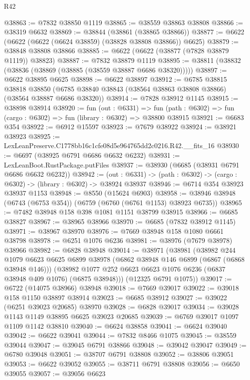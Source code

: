\begin{lexlean}{R42}
\begin{coremodule}
{@38863 := @7832 @38850 @1119
@38865 := @38559 @38863 @38808
@38866 := @38319 @6632
@38869 := @38844 (@38861 (@38865 @38866))
@38877 := @6622 (@6622 (@6622 (@6624 @38859) (@38828 @38808 @38866)) @6625)
@38879 := @38848 @38808 @38866
@38885 := @6622 (@6622 (@38877 (@7828 @38879 @1119)) @38823)
@38887 := @7832 @38879 @1119
@38895 := @38811 (@38832 (@38836 (@38869 (@38885 (@38559 @38887 @6686 @38320)))))
@38897 := @6622 @38895 @6625
@38898 := @6622 @38897
@38912 := @6785
    @38815
    @38818
    @38850
    (@6785 @38840 @38843 (@38564 @38863 @38808 @38866) (@38564 @38887 @6686 @38320))
@38914 := @7828 @38912 @1145
@38915 := @38898 @38914
@38920 := fun (out : @6331) =>
  fun (path : @6302) => fun (cargo : @6302) => fun (library : @6302) => @38800 @38915
@38921 := @6683 @354
@38922 := @6912 @15597
@38923 := @7679 @38922
@38924 := @38921 @38923
@38925 := LexLeanPreserve.C1778bb16c1cfe08d5e964765dd2c0216.R42.__fits_16
@38930 := @6697 (@38925 @6791 @6686 @6632 @6232)
@38931 := LexLeanBoot.RustPackage.putFiles
@38937 := @38930 (@6685 (@38931 @6791 @6686 @6632 @6232))
@38942 := (out : @6331) -> (path : @6302) -> (cargo : @6302) -> (library : @6302) -> @38924 @38937
@38946 := @6714 @354 @38923 @38937 @1153
@38948 := @8550 (@15624 @6903)
@38958 := @38946 @38948 (@6743 (@6753 @354)) (@6759 (@6760 (@6761 @1153) @38923 @6735))
@38965 := @7482 @38948 @158 @398 @1081 @1151 @38799 @38915
@38966 := @6685 @38827
@38967 := @38965 @38966
@38970 := @6685 (@7832 @38912 @1145)
@38971 := @38967 @38970
@38976 := @7669 @38948 @158 @1080 @6661 @38798
@38978 := @6251 @1076 @6236
@38981 := @38976 (@7679 @38978) @38966
@38982 := @6828 @38948
@39014 := @38971
    (@38981
      (@38982
        @244
        @1079
        @6623
        @6625
        @6899
        @38978
        (@6862 @38948 @146 @6899 (@6867 (@6868 @38948 @146)))
        (@38982 @1077 @252 @6623 @6623 @1076 @6236 (@6837 @38948 @409 @1076) (@6875 @38948)))
      (@12325 @6791 @1075))
@39017 := @6722 (@14075 @38966) @38948
@39018 := @7669 @39017
@39022 := @39018 @158 @1150 @38897 @38914
@39023 := @6685 @38912
@39027 := @39022 (@6251 @39023 @20685) @38970
@39028 := @6828 @39017
@39034 := @39028 @1143 @1149 @38895 @6625 @39023 @20685
@39039 := @6769 @39017 @1097 @1109 @1142 @38810
@39040 := @6624 @38858
@39041 := @6624 @39040
@39042 := @6622 @39041
@39044 := @7832 @8466 @1075
@39045 := @38559 @39044
@39047 := @39045 @6791 @38866
@39048 := @39042 @39047
@39049 := @6780 @39048
@39051 := @38707 @6791 @38808
@39052 := @38806 @39051
@39053 := @6622 @39052
@39055 := @38711 @6791 @38808
@39056 := @6650 @39055
@39057 := @39056 @6623
}
\end{coremodule}
\end{lexlean}
